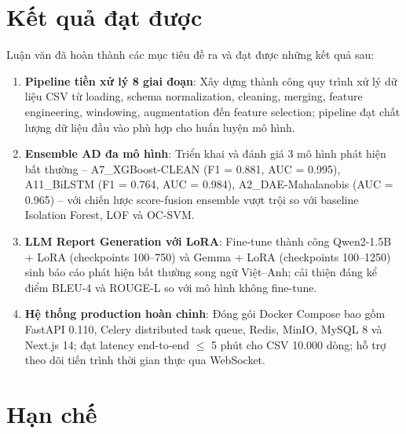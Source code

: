 
\section*{Kết quả đạt được}

Luận văn đã hoàn thành các mục tiêu đề ra và đạt được những kết quả sau:

\begin{enumerate}
  \item \textbf{Pipeline tiền xử lý 8 giai đoạn}: Xây dựng thành công quy trình xử lý dữ liệu CSV từ loading, schema normalization, cleaning, merging, feature engineering, windowing, augmentation đến feature selection; pipeline đạt chất lượng dữ liệu đầu vào phù hợp cho huấn luyện mô hình.

  \item \textbf{Ensemble AD đa mô hình}: Triển khai và đánh giá 3 mô hình phát hiện bất thường -- A7\_XGBoost-CLEAN (F1 = 0.881, AUC = 0.995), A11\_BiLSTM (F1 = 0.764, AUC = 0.984), A2\_DAE-Mahalanobis (AUC = 0.965) -- với chiến lược score-fusion ensemble vượt trội so với baseline Isolation Forest, LOF và OC-SVM.

  \item \textbf{LLM Report Generation với LoRA}: Fine-tune thành công Qwen2-1.5B + LoRA (checkpoints 100--750) và Gemma + LoRA (checkpoints 100--1250) sinh báo cáo phát hiện bất thường song ngữ Việt--Anh; cải thiện đáng kể điểm BLEU-4 và ROUGE-L so với mô hình không fine-tune.

  \item \textbf{Hệ thống production hoàn chỉnh}: Đóng gói Docker Compose bao gồm FastAPI 0.110, Celery distributed task queue, Redis, MinIO, MySQL 8 và Next.js 14; đạt latency end-to-end $\leq$ 5 phút cho CSV 10.000 dòng; hỗ trợ theo dõi tiến trình thời gian thực qua WebSocket.
\end{enumerate}

\section*{Hạn chế}

